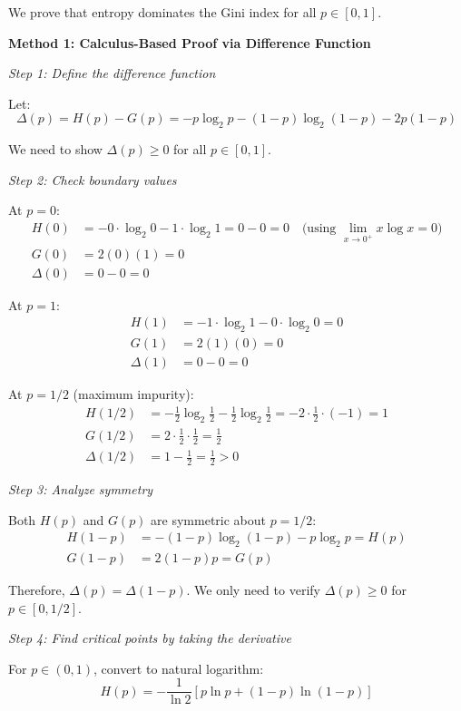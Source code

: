 \documentclass[12pt]{article}
\begin{document}
\begin{solution}
We prove that entropy dominates the Gini index for all $p \in [0,1]$.

\textbf{Method 1: Calculus-Based Proof via Difference Function}

\textit{Step 1: Define the difference function}

Let:
\[
\Delta(p) = H(p) - G(p) = -p \log_2 p - (1-p) \log_2(1-p) - 2p(1-p)
\]

We need to show $\Delta(p) \geq 0$ for all $p \in [0,1]$.

\textit{Step 2: Check boundary values}

At $p = 0$:
\begin{align*}
H(0) &= -0 \cdot \log_2 0 - 1 \cdot \log_2 1 = 0 - 0 = 0 \quad \text{(using } \lim_{x\to 0^+} x\log x = 0\text{)} \\
G(0) &= 2(0)(1) = 0 \\
\Delta(0) &= 0 - 0 = 0
\end{align*}

At $p = 1$:
\begin{align*}
H(1) &= -1 \cdot \log_2 1 - 0 \cdot \log_2 0 = 0 \\
G(1) &= 2(1)(0) = 0 \\
\Delta(1) &= 0 - 0 = 0
\end{align*}

At $p = 1/2$ (maximum impurity):
\begin{align*}
H(1/2) &= -\frac{1}{2}\log_2\frac{1}{2} - \frac{1}{2}\log_2\frac{1}{2} = -2 \cdot \frac{1}{2} \cdot (-1) = 1 \\
G(1/2) &= 2 \cdot \frac{1}{2} \cdot \frac{1}{2} = \frac{1}{2} \\
\Delta(1/2) &= 1 - \frac{1}{2} = \frac{1}{2} > 0
\end{align*}

\textit{Step 3: Analyze symmetry}

Both $H(p)$ and $G(p)$ are symmetric about $p = 1/2$:
\begin{align*}
H(1-p) &= -(1-p)\log_2(1-p) - p\log_2 p = H(p) \\
G(1-p) &= 2(1-p)p = G(p)
\end{align*}

Therefore, $\Delta(p) = \Delta(1-p)$. We only need to verify $\Delta(p) \geq 0$ for $p \in [0, 1/2]$.

\textit{Step 4: Find critical points by taking the derivative}

For $p \in (0,1)$, convert to natural logarithm:
\[
H(p) = -\frac{1}{\ln 2}[p \ln p + (1-p)\ln(1-p)]
\]


\end{solution}
\end{document}

